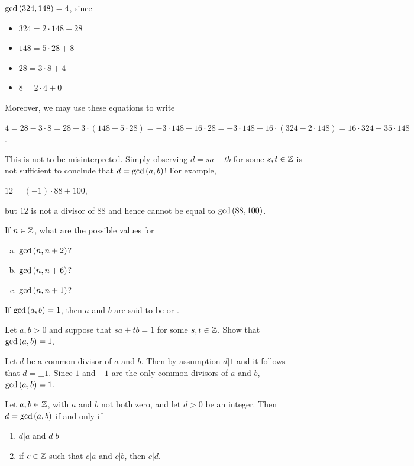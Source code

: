 \documentclass[11pt,fleqn,dvipsnames,usenames]{article}
\newcommand{\p}{\noindent}
\begin{document}
\begin{example}
$\text{gcd}\left(324, 148\right) = 4$, since
\begin{itemize}[\ ]
\item $324 = 2\cdot 148 + 28$
\item $148 = 5\cdot 28 + 8$
\item $28 = 3\cdot 8 + 4$
\item $8 = 2\cdot 4 + 0$
\end{itemize}

\p Moreover, we may use these equations to write
\begin{center}
$4 = 28 - 3\cdot 8 = 28 - 3\cdot (148 - 5\cdot 28) = -3\cdot 148 + 16\cdot 28 = -3\cdot 148 + 16\cdot (324 - 2\cdot 148) = 16\cdot 324 - 35\cdot 148$.
\end{center}
\end{example}
\newpage

\caution This is not to be misinterpreted.  Simply observing $d = sa + tb$ for some $s,t\in\mathbb{Z}$ is not sufficient to conclude that $d = \text{gcd}\left(a, b\right)$!  For example,
\begin{center}
$12 = (-1)\cdot 88 + 100$,
\end{center}
but $12$ is not a divisor of $88$ and hence cannot be equal to $\text{gcd}\left(88,100\right)$.
\vsp

\begin{exercise}
If $n\in\mathbb{Z}$, what are the possible values for
\begin{enumerate}[(a)]
\item $\text{gcd}\left(n, n+2\right)$?
\item $\text{gcd}\left(n, n+6\right)$?
\item $\text{gcd}\left(n, n+1\right)$?
\end{enumerate}
\end{exercise}

 If $\text{gcd}\left(a,b\right) = 1$, then $a$ and $b$ are said to be   or .
\vsp

\begin{example}
Let $a,b > 0$ and suppose that $sa + tb = 1$ for some $s,t\in\mathbb{Z}$.  Show that $\text{gcd}\left(a,b\right) = 1$.
\end{example}

\solution Let $d$ be a common divisor of $a$ and $b$.  Then by assumption $d|1$ and it follows that $d = \pm 1$.  Since $1$ and $-1$ are the only common divisors of $a$ and $b$, $\text{gcd}\left(a,b\right) = 1$.
\vsp

\begin{corollary}\label{gcdaltdef}
Let $a,b\in\mathbb{Z}$, with $a$ and $b$ not both zero, and let $d>0$ be an integer.  Then $d = \text{gcd}\left(a,b\right)$ if and only if
\begin{enumerate}[(1)]
\item $d|a$ and $d|b$
\item if $c\in\mathbb{Z}$ such that $c|a$ and $c|b$, then $c|d$.
\end{enumerate}
\end{corollary}
\end{document}
